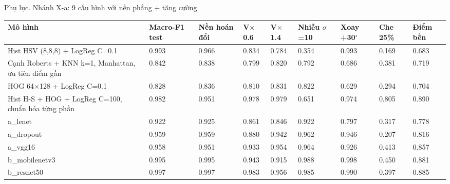 \documentclass[aspectratio=169,10pt]{beamer}
\begin{document}
\begin{frame}{Phụ lục. Nhánh X-a: 9 cấu hình với nền phẳng + tăng cường}
\begin{center}\begin{adjustbox}{max width=\linewidth,max totalheight=0.74\textheight}
\begin{tabular}{lllllllll}\toprule
\textbf{Mô hình} & \textbf{Macro-F1 test} & \textbf{Nền hoán đổi} & \textbf{V$\times$0.6} & \textbf{V$\times$1.4} & \textbf{Nhiễu $\sigma$=10} & \textbf{Xoay +30$^\circ$} & \textbf{Che 25\%} & \textbf{Điểm bền} \\ \midrule
Hist HSV (8,8,8) + LogReg C=0.1 & 0.993 & 0.966 & 0.834 & 0.784 & 0.354 & 0.993 & 0.169 & 0.683 \\
Cạnh Roberts + KNN k=1, Manhattan, ưu tiên điểm gần & 0.842 & 0.838 & 0.799 & 0.820 & 0.792 & 0.686 & 0.381 & 0.719 \\
HOG 64$\times$128 + LogReg C=0.1 & 0.828 & 0.836 & 0.810 & 0.831 & 0.822 & 0.629 & 0.294 & 0.704 \\
Hist H-S + HOG + LogReg C=100, chuẩn hóa từng phần & 0.982 & 0.951 & 0.978 & 0.979 & 0.651 & 0.974 & 0.805 & 0.890 \\
a\_lenet & 0.922 & 0.925 & 0.861 & 0.846 & 0.922 & 0.797 & 0.317 & 0.778 \\
a\_dropout & 0.959 & 0.959 & 0.880 & 0.942 & 0.962 & 0.946 & 0.207 & 0.816 \\
a\_vgg16 & 0.958 & 0.951 & 0.933 & 0.954 & 0.964 & 0.926 & 0.413 & 0.857 \\
b\_mobilenetv3 & 0.995 & 0.995 & 0.943 & 0.915 & 0.988 & 0.998 & 0.450 & 0.881 \\
b\_resnet50 & 0.997 & 0.997 & 0.983 & 0.956 & 0.985 & 0.990 & 0.397 & 0.885 \\
\bottomrule\end{tabular}
\end{adjustbox}\end{center}
\end{frame}
\end{document}

